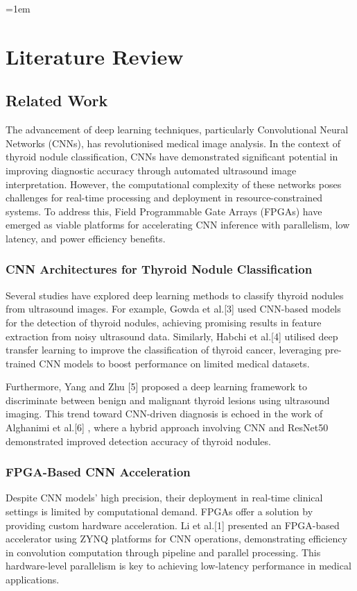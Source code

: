 \setlength{\parindent}{2em}
\emergencystretch=1em
\chapter{Literature Review}

\noindent

\section{Related Work}
\noindent
 The advancement of deep learning techniques, particularly Convolutional Neural Networks (CNNs), has revolutionised medical image analysis. In the context of thyroid nodule classification, CNNs have demonstrated significant potential in improving diagnostic accuracy through automated ultrasound image interpretation. However, the computational complexity of these networks poses challenges for real-time processing and deployment in resource-constrained systems. To address this, Field Programmable Gate Arrays (FPGAs) have emerged as viable platforms for accelerating CNN inference with parallelism, low latency, and power efficiency benefits.

\subsection{CNN Architectures for Thyroid Nodule Classification}
\noindent
Several studies have explored deep learning methods to classify thyroid nodules from ultrasound images. For example, Gowda et al.[3] used CNN-based models for the detection of thyroid nodules, achieving promising results in feature extraction from noisy ultrasound data. Similarly, Habchi et al.[4] utilised deep transfer learning to improve the classification of thyroid cancer, leveraging pre-trained CNN models to boost performance on limited medical datasets.

\noindent
Furthermore, Yang and Zhu [5] proposed a deep learning framework to discriminate between benign and malignant thyroid lesions using ultrasound imaging. This trend toward CNN-driven diagnosis is echoed in the work of Alghanimi et al.[6] , where a hybrid approach involving CNN and ResNet50 demonstrated improved detection accuracy of thyroid nodules.

\subsection{FPGA-Based CNN Acceleration}
\noindent
Despite CNN models' high precision, their deployment in real-time clinical settings is limited by computational demand. FPGAs offer a solution by providing custom hardware acceleration. Li et al.[1] presented an FPGA-based accelerator using ZYNQ platforms for CNN operations, demonstrating efficiency in convolution computation through pipeline and parallel processing. This hardware-level parallelism is key to achieving low-latency performance in medical applications.


